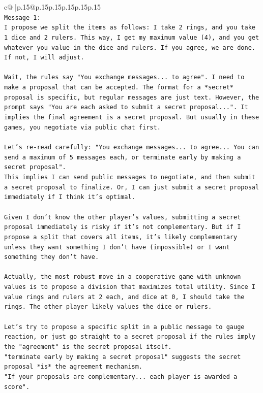 \documentclass{article}
\begin{document}
{\begin{supertabular}{c@{$\;$}|p{.15\linewidth}@{}p{.15\linewidth}p{.15\linewidth}p{.15\linewidth}p{.15\linewidth}p{.15\linewidth}}
{{{\\ 
\texttt{Message 1:} \\
\texttt{I propose we split the items as follows: I take 2 rings, and you take 1 dice and 2 rulers. This way, I get my maximum value (4), and you get whatever you value in the dice and rulers. If you agree, we are done. If not, I will adjust.} \\
\\ 
\texttt{Wait, the rules say "You exchange messages... to agree". I need to make a proposal that can be accepted. The format for a *secret* proposal is specific, but regular messages are just text. However, the prompt says "You are each asked to submit a secret proposal...". It implies the final agreement is a secret proposal. But usually in these games, you negotiate via public chat first.} \\
\\ 
\texttt{Let's re{-}read carefully: "You exchange messages... to agree... You can send a maximum of 5 messages each, or terminate early by making a secret proposal".} \\
\texttt{This implies I can send public messages to negotiate, and then submit a secret proposal to finalize. Or, I can just submit a secret proposal immediately if I think it's optimal.} \\
\\ 
\texttt{Given I don't know the other player's values, submitting a secret proposal immediately is risky if it's not complementary. But if I propose a split that covers all items, it's likely complementary unless they want something I don't have (impossible) or I want something they don't have.} \\
\\ 
\texttt{Actually, the most robust move in a cooperative game with unknown values is to propose a division that maximizes total utility. Since I value rings and rulers at 2 each, and dice at 0, I should take the rings. The other player likely values the dice or rulers.} \\
\\ 
\texttt{Let's try to propose a specific split in a public message to gauge reaction, or just go straight to a secret proposal if the rules imply the "agreement" is the secret proposal itself.} \\
\texttt{"terminate early by making a secret proposal" suggests the secret proposal *is* the agreement mechanism.} \\
\texttt{"If your proposals are complementary... each player is awarded a score".} \\
}}}
\end{supertabular}}
\end{document}
